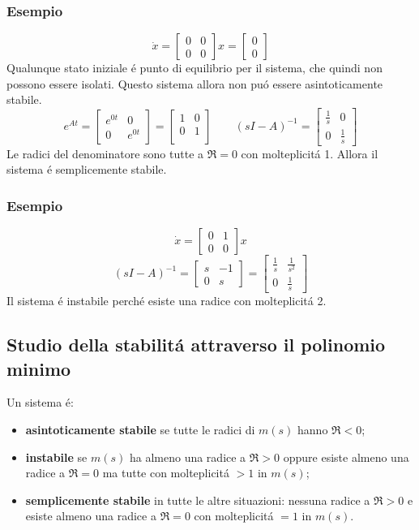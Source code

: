 \documentclass[../main.tex]{subfiles}
\begin{document}
	\subsubsection*{Esempio}
	\label{esempio:semplicemente_stabile}
		\[ \dot x =
			\begin{bmatrix}
				0 & 0\\
				0 & 0
			\end{bmatrix} x = \begin{bmatrix} 0\\ 0 \end{bmatrix}
		\]
		Qualunque stato iniziale \'e punto di equilibrio per il sistema, che quindi non possono essere isolati. Questo sistema allora non pu\'o essere asintoticamente stabile.
		\[ e^{At} =
			\begin{bmatrix} e^{0t} & 0\\ 0 & e^{0t} \end{bmatrix} =
			\begin{bmatrix} 1 & 0\\ 0 & 1\\ \end{bmatrix} \qquad
			(sI-A)^{-1} = \begin{bmatrix} \frac{1}{s} & 0\\ 0 & \frac{1}{s} \end{bmatrix}
		\]
		Le radici del denominatore sono tutte a $ \Re = 0 $ con molteplicit\'a 1. Allora il sistema \'e semplicemente stabile.
		
	\subsubsection*{Esempio}
		\[ 
			\dot x = \begin{bmatrix} 0 & 1\\ 0 & 0 \end{bmatrix} x
		\]
		\[
			(sI-A)^{-1} = \begin{bmatrix} s & -1\\ 0 & s \end{bmatrix} = \begin{bmatrix} \frac{1}{s} & \frac{1}{s^2}\\ 0 & \frac{1}{s} \end{bmatrix}
		\]
		Il sistema \'e instabile perch\'e esiste una radice con molteplicit\'a 2.
		
	\subsection{Studio della stabilit\'a attraverso il polinomio minimo}
		Un sistema \'e:
		\begin{itemize}
			\item
				\textbf{asintoticamente stabile} se tutte le radici di $ m(s) $ hanno $ \Re < 0 $;
			\item
				\textbf{instabile} se $ m(s) $ ha almeno una radice a $ \Re > 0 $ oppure esiste almeno una radice a $ \Re = 0 $ ma tutte con molteplicit\'a $ >1 $ in $ m(s) $;
			\item
				\textbf{semplicemente stabile} in tutte le altre situazioni: nessuna radice a $ \Re > 0 $ e esiste almeno una radice a $ \Re = 0 $ con molteplicit\'a $ =1 $ in $ m(s) $.
		\end{itemize}
	
\end{document}
